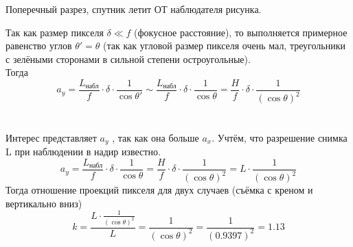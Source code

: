 \begin{enumerate}
    \begin{center}
        Поперечный разрез, спутник летит ОТ наблюдателя рисунка. \\
    \end{center}
    Так как размер пикселя $\delta\ll f$ (фокусное расстояние), то выполняется примерное равенство углов $\theta'=\theta$ (так как угловой размер пикселя очень мал, треугольники с зелёными сторонами в сильной степени остроугольные). \\
    Тогда $$a_y=\frac{L_\text{набл}}{f}\cdot\delta\cdot\frac{1}{\cos\theta'}\sim \frac{L_\text{набл}}{f}\cdot\delta\cdot\frac{1}{\cos\theta} =\frac{H}{f}\cdot\delta\cdot\frac{1}{(\cos\theta)^2}$$\\\\
    Интерес представляет $a_y$ , так как она больше $a_x$. Учтём, что разрешение снимка L при наблюдении в надир известно.
    $$a_y=\frac{L_\text{набл}}{f}\cdot\delta\cdot\frac{1}{\cos\theta}=\frac{H}{f}\cdot\delta\cdot\frac{1}{(\cos\theta)^2} =L\cdot\frac{1}{(\cos\theta)^2}$$ 
    Тогда отношение проекций пикселя для двух случаев (съёмка с креном и вертикально вниз)
    $$k=\frac{L\cdot\frac{1}{(\cos\theta)^2}}{L}=\frac{1}{(\cos\theta)^2}=\frac{1}{(0.9397)^2} =1.13$$
    

\end{enumerate}
